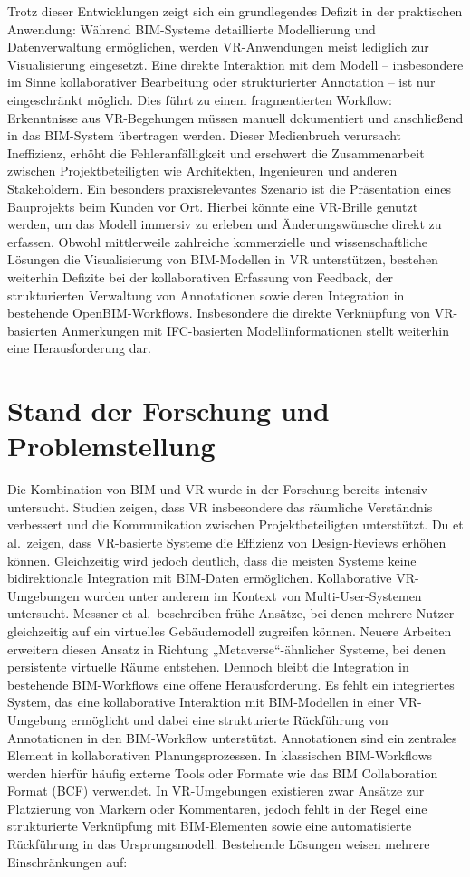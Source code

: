 Trotz dieser Entwicklungen zeigt sich ein grundlegendes Defizit in der praktischen Anwendung: Während BIM-Systeme detaillierte Modellierung und Datenverwaltung ermöglichen, werden VR-Anwendungen meist lediglich zur Visualisierung eingesetzt.
Eine direkte Interaktion mit dem Modell – insbesondere im Sinne kollaborativer Bearbeitung oder strukturierter Annotation – ist nur eingeschränkt möglich.\cite{Whyte2018}
Dies führt zu einem fragmentierten Workflow: Erkenntnisse aus VR-Begehungen müssen manuell dokumentiert und anschließend in das BIM-System übertragen werden.
Dieser Medienbruch verursacht Ineffizienz, erhöht die Fehleranfälligkeit und erschwert die Zusammenarbeit zwischen Projektbeteiligten wie Architekten, Ingenieuren und anderen Stakeholdern.
Ein besonders praxisrelevantes Szenario ist die Präsentation eines Bauprojekts beim Kunden vor Ort.
Hierbei könnte eine VR-Brille genutzt werden, um das Modell immersiv zu erleben und Änderungswünsche direkt zu erfassen.
Obwohl mittlerweile zahlreiche kommerzielle und wissenschaftliche Lösungen die Visualisierung von BIM-Modellen in VR unterstützen, bestehen weiterhin Defizite bei der kollaborativen Erfassung von Feedback, der strukturierten Verwaltung von Annotationen sowie deren Integration in bestehende OpenBIM-Workflows.
Insbesondere die direkte Verknüpfung von VR-basierten Anmerkungen mit IFC-basierten Modellinformationen stellt weiterhin eine Herausforderung dar.

\section{Stand der Forschung und Problemstellung}

Die Kombination von BIM und VR wurde in der Forschung bereits intensiv untersucht.
Studien zeigen, dass VR insbesondere das räumliche Verständnis verbessert und die Kommunikation zwischen Projektbeteiligten unterstützt.\cite{Whyte2018}
Du et al.\ zeigen, dass VR-basierte Systeme die Effizienz von Design-Reviews erhöhen können.
Gleichzeitig wird jedoch deutlich, dass die meisten Systeme keine bidirektionale Integration mit BIM-Daten ermöglichen.
Kollaborative VR-Umgebungen wurden unter anderem im Kontext von Multi-User-Systemen untersucht.
Messner et al.\ beschreiben frühe Ansätze, bei denen mehrere Nutzer gleichzeitig auf ein virtuelles Gebäudemodell zugreifen können.
Neuere Arbeiten erweitern diesen Ansatz in Richtung „Metaverse“-ähnlicher Systeme, bei denen persistente virtuelle Räume entstehen.\cite{Wang2018}
Dennoch bleibt die Integration in bestehende BIM-Workflows eine offene Herausforderung.
Es fehlt ein integriertes System, das eine kollaborative Interaktion mit BIM-Modellen in einer VR-Umgebung ermöglicht und dabei eine strukturierte Rückführung von Annotationen in den BIM-Workflow unterstützt.
Annotationen sind ein zentrales Element in kollaborativen Planungsprozessen.
In klassischen BIM-Workflows werden hierfür häufig externe Tools oder Formate wie das BIM Collaboration Format (BCF) verwendet.
In VR-Umgebungen existieren zwar Ansätze zur Platzierung von Markern oder Kommentaren, jedoch fehlt in der Regel eine strukturierte Verknüpfung mit BIM-Elementen sowie eine automatisierte Rückführung in das Ursprungsmodell.\cite{Wang2018}
Bestehende Lösungen weisen mehrere Einschränkungen auf:

